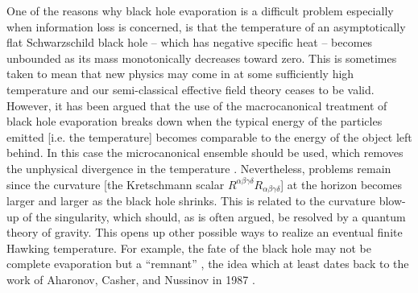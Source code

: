 \documentclass[12pt]{article}
\newcommand{\2}{$^2$}
\newcommand{\3}{$^3$}
\newcommand{\4}{$_4$}
\newcommand{\5}{$_5$}
\begin{document}
One of the reasons why black hole evaporation is a difficult problem especially when information loss is concerned, is that the temperature of an asymptotically flat Schwarzschild black hole -- which has negative specific heat -- becomes unbounded as its mass monotonically decreases toward zero. This is sometimes taken to mean that new physics may come in at some sufficiently high temperature and our semi-classical effective field theory ceases to be valid. However, it has been argued that the use of the macrocanonical treatment of black hole evaporation
breaks down when the typical energy of the particles emitted
[i.e. the temperature] becomes comparable to the energy of the
object left behind. In this case the microcanonical ensemble
should be used, which removes the unphysical divergence in the
temperature \cite{ham1,ham2,ham3, 0412265}. Nevertheless, problems remain since the curvature [the Kretschmann scalar $R^{\alpha\beta\gamma\delta}R_{\alpha\beta\gamma\delta}$] at the horizon becomes larger and larger as the black hole shrinks. This is related to the curvature blow-up of the singularity, which should, as is often argued, be resolved by a quantum theory of gravity.
This opens up other possible ways to realize an eventual finite Hawking temperature. For example, the fate of the black hole may not be complete evaporation but a ``remnant'' \cite{pisin}, the idea which at least dates back to the work of Aharonov, Casher, and Nussinov in 1987 \cite{ACN}. 
\end{document}
